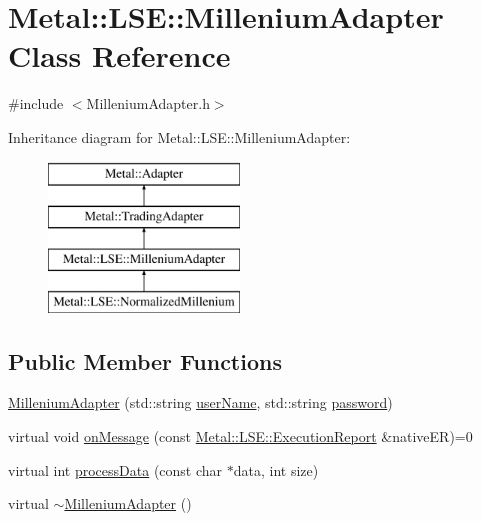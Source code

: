 \hypertarget{classMetal_1_1LSE_1_1MilleniumAdapter}{}\section{Metal\+:\+:L\+S\+E\+:\+:Millenium\+Adapter Class Reference}
\label{classMetal_1_1LSE_1_1MilleniumAdapter}


{\ttfamily \#include $<$Millenium\+Adapter.\+h$>$}

Inheritance diagram for Metal\+:\+:L\+S\+E\+:\+:Millenium\+Adapter\+:\begin{figure}[H]
\begin{center}
\leavevmode
\includegraphics[height=4.000000cm]{classMetal_1_1LSE_1_1MilleniumAdapter}
\end{center}
\end{figure}
\subsection*{Public Member Functions}
\begin{DoxyCompactItemize}
\item 
\hyperlink{classMetal_1_1LSE_1_1MilleniumAdapter_abc4133dd6d89a8271d4c64eb46d365c1}{Millenium\+Adapter} (std\+::string \hyperlink{classMetal_1_1LSE_1_1MilleniumAdapter_a1c12122da30ec79f3907a82ac1847c33}{user\+Name}, std\+::string \hyperlink{classMetal_1_1LSE_1_1MilleniumAdapter_aa8120f11aac5d4825a5766d86e53e5a2}{password})
\item 
virtual void \hyperlink{classMetal_1_1LSE_1_1MilleniumAdapter_a202fb52a6d4f4434c93375dd68d27093}{on\+Message} (const \hyperlink{classMetal_1_1LSE_1_1ExecutionReport}{Metal\+::\+L\+S\+E\+::\+Execution\+Report} \&native\+E\+R)=0
\item 
virtual int \hyperlink{classMetal_1_1LSE_1_1MilleniumAdapter_aaf1486db897674d020aaa9a67a350158}{process\+Data} (const char $\ast$data, int size)
\item 
virtual \hyperlink{classMetal_1_1LSE_1_1MilleniumAdapter_ae41556fc2351e0dd76e0334b19366af7}{$\sim$\+Millenium\+Adapter} ()
\end{DoxyCompactItemize}
